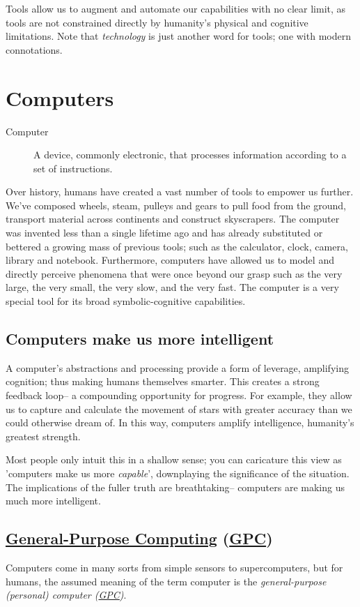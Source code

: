 \documentclass[logo,bsc,singlespacing,parskip]{infthesis}
\begin{document}
Tools allow us to augment and automate our capabilities with no clear limit, as tools are not constrained directly by humanity's physical and cognitive limitations.
Note that \emph{technology} is just another word for tools; one with modern connotations.
\chapter{Computers}
\label{sec:org21e9465}
\begin{mdframed}
\begin{description}
\item[{Computer\label{Computer}}] A device, commonly electronic, that processes information according to a set of instructions.
\end{description}
\end{mdframed}

Over history,  humans have created a vast number of tools to empower us further.
We've composed wheels, steam, pulleys and gears to pull food from the ground, transport material across continents and construct skyscrapers.
The computer was invented less than a single lifetime ago and has already substituted or bettered a growing mass of previous tools; such as the calculator, clock, camera, library and notebook.
Furthermore, computers have allowed us to model and directly perceive phenomena that were once beyond our grasp such as the very large, the very small, the very slow, and the very fast.
The computer is a very special tool for its broad symbolic-cognitive capabilities.
\section{Computers make us more intelligent}
\label{sec:org1906a79}
A computer's abstractions and processing provide a form of leverage, amplifying cognition; thus making humans themselves smarter.
This creates a strong feedback loop-- a compounding opportunity for progress.
For example, they allow us to capture and calculate the movement of stars with greater accuracy than we could otherwise dream of.
In this way, computers amplify intelligence, humanity's greatest strength.

Most people only intuit this in a shallow sense; you can caricature this view as 'computers make us more \emph{capable}', downplaying the significance of the situation.
The implications of the fuller truth are breathtaking-- computers are making us much more intelligent.

\section{\hyperref[orgbaec896]{General-Purpose Computing} (\hyperref[org6ef4753]{GPC})}
\label{sec:org73fa0c6}
Computers come in many sorts from simple sensors to supercomputers, but for humans, the assumed meaning of the term computer is the \emph{general-purpose (personal) computer (\hyperref[org6ef4753]{GPC})}.
\end{document}
